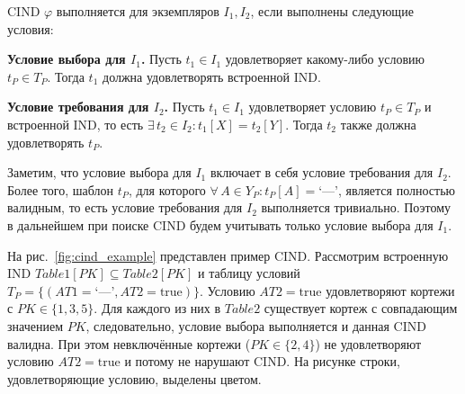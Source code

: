 CIND $\varphi$ выполняется для экземпляров $I_1, I_2$, если выполнены следующие условия:

\textbf{Условие выбора для $I_1$.} Пусть $t_1 \in I_1$ удовлетворяет какому-либо условию $t_P \in T_P$. Тогда $t_1$ должна удовлетворять встроенной IND.

\textbf{Условие требования для $I_2$.} Пусть $t_1 \in I_1$ удовлетворяет условию $t_P \in T_P$ и встроенной IND, то есть $\exists\, t_2 \in I_2 : t_1[X] = t_2[Y]$. Тогда $t_2$ также должна удовлетворять $t_P$.

Заметим, что условие выбора для $I_1$ включает в себя условие требования для $I_2$. Более того, шаблон $t_P$, для которого $\forall\, A \in Y_P : t_P[A] = \text{`---'}$, является полностью валидным, то есть условие требования для $I_2$ выполняется тривиально. Поэтому в дальнейшем при поиске CIND будем учитывать только условие выбора для $I_1$.

На рис.~\ref{fig:cind_example} представлен пример CIND. Рассмотрим встроенную IND $\mathit{Table1}[\mathit{PK}] \subseteq \mathit{Table2}[\mathit{PK}]$ и таблицу условий $T_P = \{(\mathit{AT1} = \text{`---'}, \mathit{AT2} = \text{true})\}$. Условию $\mathit{AT2} = \text{true}$ удовлетворяют кортежи с $\mathit{PK} \in \{1, 3, 5\}$. Для каждого из них в $\mathit{Table2}$ существует кортеж с совпадающим значением $\mathit{PK}$, следовательно, условие выбора выполняется и данная CIND валидна. При этом невключённые кортежи ($\mathit{PK} \in \{2, 4\}$) не удовлетворяют условию $\mathit{AT2} = \text{true}$ и потому не нарушают CIND. На рисунке строки, удовлетворяющие условию, выделены цветом.

